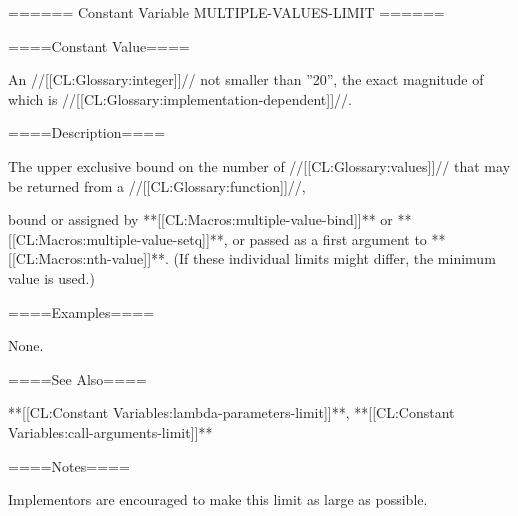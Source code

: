 ====== Constant Variable MULTIPLE-VALUES-LIMIT ======

====Constant Value====

An //[[CL:Glossary:integer]]// not smaller than ''20'', the exact magnitude of which is //[[CL:Glossary:implementation-dependent]]//.

====Description====

The upper exclusive bound on the number of //[[CL:Glossary:values]]// that may be returned from a //[[CL:Glossary:function]]//,

bound or assigned by **[[CL:Macros:multiple-value-bind]]** or **[[CL:Macros:multiple-value-setq]]**, or passed as a first argument to **[[CL:Macros:nth-value]]**. (If these individual limits might differ, the minimum value is used.)

====Examples====

None.

====See Also====

**[[CL:Constant Variables:lambda-parameters-limit]]**, **[[CL:Constant Variables:call-arguments-limit]]**

====Notes====

Implementors are encouraged to make this limit as large as possible.

